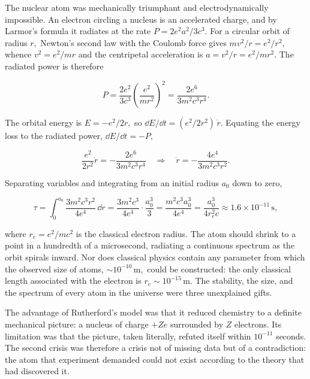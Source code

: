 The nuclear atom was mechanically triumphant and electrodynamically impossible. An electron circling a nucleus is an accelerated charge, and by Larmor's formula it radiates at the rate $P=2e^2a^2/3c^3.$ For a circular orbit of radius $r,$ Newton's second law with the Coulomb force gives $mv^{2}/r=e^{2}/r^{2},$ whence $v^{2}=e^{2}/mr$ and the centripetal acceleration is $a=v^{2}/r=e^{2}/mr^{2}.$ The radiated power is therefore
\begin{linenomath}
    \begin{equation}
        P=\frac{2e^{2}}{3c^{3}}\left(\frac{e^{2}}{mr^{2}}\right)^{2}
          =\frac{2e^{6}}{3m^{2}c^{3}r^{4}}.
    \end{equation}
\end{linenomath}
The orbital energy is $E=-e^{2}/2r,$ so $\dd E/\dd t=(e^{2}/2r^{2})\,\dot r.$ Equating the energy loss to the radiated power, $\dd E/\dd t=-P,$
\begin{linenomath}
    \begin{equation}
        \frac{e^{2}}{2r^{2}}\dot r=-\frac{2e^{6}}{3m^{2}c^{3}r^{4}}
        \quad\Longrightarrow\quad
        \dot r=-\frac{4e^{4}}{3m^{2}c^{3}r^{2}}.
    \end{equation}
\end{linenomath}
Separating variables and integrating from an initial radius $a_{0}$ down to zero,
\begin{linenomath}
    \begin{equation}
        \tau=\int_{0}^{a_{0}}\frac{3m^{2}c^{3}r^{2}}{4e^{4}}\,\dd r
        =\frac{3m^{2}c^{3}}{4e^{4}}\cdot\frac{a_{0}^{3}}{3}
        =\frac{m^{2}c^{3}a_{0}^{3}}{4e^{4}}
        =\frac{a_{0}^{3}}{4r_{e}^{2}c}\approx 1.6\times10^{-11}\,\mathrm{s},
    \end{equation}
\end{linenomath}
where $r_e=e^2/mc^2$ is the classical electron radius. The atom should shrink to a point in a hundredth of a microsecond, radiating a continuous spectrum as the orbit spirals inward. Nor does classical physics contain any parameter from which the observed size of atoms, $\sim10^{-10}\,\mathrm{m},$ could be constructed: the only classical length associated with the electron is $r_e\sim10^{-15}\,\mathrm{m}.$ The stability, the size, and the spectrum of every atom in the universe were three unexplained gifts.

The advantage of Rutherford's model was that it reduced chemistry to a definite mechanical picture: a nucleus of charge $+Ze$ surrounded by $Z$ electrons. Its limitation was that the picture, taken literally, refuted itself within $10^{-11}$ seconds. The second crisis was therefore a crisis not of missing data but of a contradiction: the atom that experiment demanded could not exist according to the theory that had discovered it.

